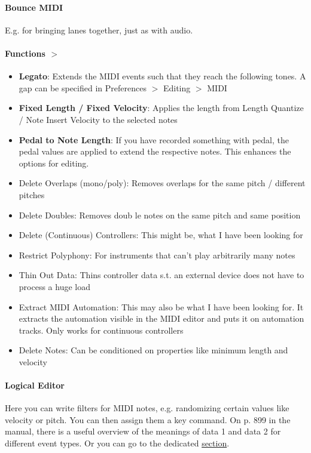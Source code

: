 \documentclass[10pt]{article}
\begin{document}
\paragraph{Bounce MIDI} E.g. for bringing lanes together, just as with audio.

\paragraph{Functions $>$} 

\begin{itemize}
	\item \textbf{Legato}: Extends the MIDI events such that they reach the following tones. A gap can be specified in Preferences $>$ Editing $>$ MIDI
	\item \textbf{Fixed Length / Fixed Velocity}: Applies the length from Length Quantize / Note Insert Velocity to the selected notes
	\item \textbf{Pedal to Note Length}: If you have recorded something with pedal, the pedal values are applied to extend the respective notes. This enhances the options for editing.
	\item Delete Overlaps (mono/poly): Removes overlaps for the same pitch / different pitches
	\item Delete Doubles: Removes doub le notes on the same pitch and same position
	\item Delete (Continuous) Controllers: This might be, what I have been looking for
	\item Restrict Polyphony: For instruments that can't play arbitrarily many notes
	\item Thin Out Data: Thins controller data s.t. an external device does not have to process a huge load
	\item Extract MIDI Automation: This may also be what I have been looking for. It extracts the automation visible in the MIDI editor and puts it on automation tracks. Only works for continuous controllers
	\item Delete Notes: Can be conditioned on properties like minimum length and velocity
\end{itemize}

\paragraph{Logical Editor} Here you can write filters for MIDI notes, e.g. randomizing certain values like velocity or pitch. You can then assign them a key command. On p. 899 in the manual, there is a useful overview of the meanings of data 1 and data 2 for different event types. Or you can go to the dedicated \hyperlink{LogicalEditor}{section}.
\end{document}
